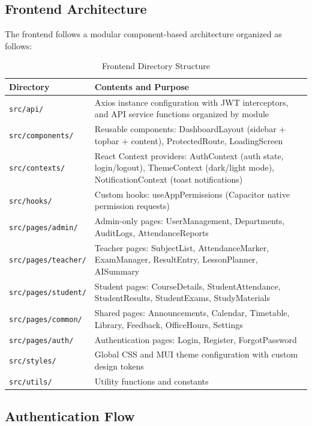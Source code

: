\subsection{Frontend Architecture}

The frontend follows a modular component-based architecture organized as follows:

\begin{table}[H]
\centering
\caption{Frontend Directory Structure}
\label{tab:frontend_structure}
\footnotesize
\begin{tabular}{|p{3.5cm}|p{10cm}|}
\hline
\textbf{Directory} & \textbf{Contents and Purpose} \\
\hline
\texttt{src/api/} & Axios instance configuration with JWT interceptors, and API service functions organized by module \\
\hline
\texttt{src/components/} & Reusable components: DashboardLayout (sidebar + topbar + content), ProtectedRoute, LoadingScreen \\
\hline
\texttt{src/contexts/} & React Context providers: AuthContext (auth state, login/logout), ThemeContext (dark/light mode), NotificationContext (toast notifications) \\
\hline
\texttt{src/hooks/} & Custom hooks: useAppPermissions (Capacitor native permission requests) \\
\hline
\texttt{src/pages/admin/} & Admin-only pages: UserManagement, Departments, AuditLogs, AttendanceReports \\
\hline
\texttt{src/pages/teacher/} & Teacher pages: SubjectList, AttendanceMarker, ExamManager, ResultEntry, LessonPlanner, AISummary \\
\hline
\texttt{src/pages/student/} & Student pages: CourseDetails, StudentAttendance, StudentResults, StudentExams, StudyMaterials \\
\hline
\texttt{src/pages/common/} & Shared pages: Announcements, Calendar, Timetable, Library, Feedback, OfficeHours, Settings \\
\hline
\texttt{src/pages/auth/} & Authentication pages: Login, Register, ForgotPassword \\
\hline
\texttt{src/styles/} & Global CSS and MUI theme configuration with custom design tokens \\
\hline
\texttt{src/utils/} & Utility functions and constants \\
\hline
\end{tabular}
\end{table}

\subsection{Authentication Flow}

